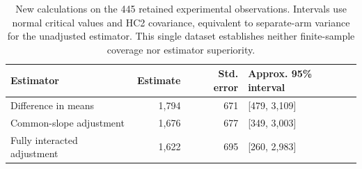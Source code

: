 
\begin{table}[htbp]
\centering\small
\begin{tabular}{lrrl}
\toprule
Estimator & Estimate & Std. error & Approx. 95\% interval \\
\midrule
Difference in means & 1,794 & 671 & [479, 3,109] \\
Common-slope adjustment & 1,676 & 677 & [349, 3,003] \\
Fully interacted adjustment & 1,622 & 695 & [260, 2,983] \\
\bottomrule
\end{tabular}
\caption{New calculations on the 445 retained experimental observations.
Intervals use normal critical values and HC2 covariance, equivalent to
separate-arm variance for the unadjusted estimator. This single dataset
establishes neither finite-sample coverage nor estimator superiority.}
\end{table}
